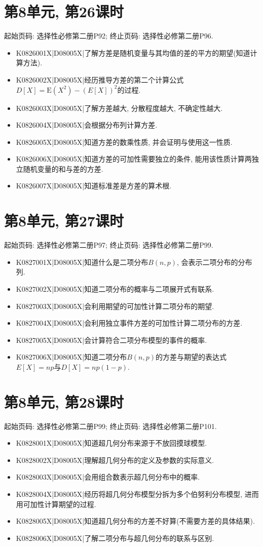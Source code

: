 \section*{第8单元, 第26课时}
起始页码: 选择性必修第二册P92; 终止页码: 选择性必修第二册P96.
\begin{itemize}
\item K0826001X|D08005X|了解方差是随机变量与其均值的差的平方的期望(知道计算方法).
\item K0826002X|D08005X|经历推导方差的第二个计算公式$D[X]=\mathrm{E}(X^2)-(E[X])^2$的过程.
\item K0826003X|D08005X|了解方差越大, 分散程度越大, 不确定性越大.
\item K0826004X|D08005X|会根据分布列计算方差.
\item K0826005X|D08005X|知道方差的数乘性质, 并会证明与使用这一性质.
\item K0826006X|D08005X|知道方差的可加性需要独立的条件, 能用该性质计算两独立随机变量的和与差的方差.
\item K0826007X|D08005X|知道标准差是方差的算术根.
\end{itemize}

\section*{第8单元, 第27课时}
起始页码: 选择性必修第二册P97; 终止页码: 选择性必修第二册P99.
\begin{itemize}
\item K0827001X|D08005X|知道什么是二项分布$B(n,p)$, 会表示二项分布的分布列.
\item K0827002X|D08005X|知道二项分布的概率与二项展开式有联系.
\item K0827003X|D08005X|会利用期望的可加性计算二项分布的期望.
\item K0827004X|D08005X|会利用独立事件方差的可加性计算二项分布的方差.
\item K0827005X|D08005X|会计算符合二项分布模型的事件的概率.
\item K0827006X|D08005X|知道二项分布$B(n,p)$的方差与期望的表达式$E[X]=np$与$D[X]=np(1-p)$.
\end{itemize}

\section*{第8单元, 第28课时}
起始页码: 选择性必修第二册P99; 终止页码: 选择性必修第二册P101.
\begin{itemize}
\item K0828001X|D08005X|知道超几何分布来源于不放回摸球模型.
\item K0828002X|D08005X|理解超几何分布的定义及参数的实际意义.
\item K0828003X|D08005X|会用组合数表示超几何分布中的概率.
\item K0828004X|D08005X|经历将超几何分布模型分拆为多个伯努利分布模型, 进而用可加性计算期望的过程.
\item K0828005X|D08005X|知道超几何分布的方差不好算(不需要方差的具体结果).
\item K0828006X|D08005X|了解二项分布与超几何分布的联系与区别.
\end{itemize}

